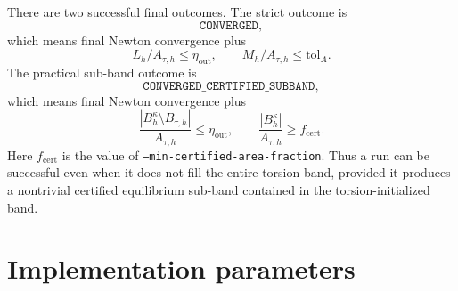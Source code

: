 \documentclass[11pt]{article}
\begin{document}
There are two successful final outcomes.  The strict outcome is
\[
\texttt{CONVERGED},
\]
which means final Newton convergence plus
\[
L_h/A_{\tau,h}\leq\eta_{\mathrm{out}},
\qquad
M_h/A_{\tau,h}\leq \mathrm{tol}_A.
\]
The practical sub-band outcome is
\[
\texttt{CONVERGED\_CERTIFIED\_SUBBAND},
\]
which means final Newton convergence plus
\[
\frac{|B_h^\kappa\setminus B_{\tau,h}|}{A_{\tau,h}}
\leq
\eta_{\mathrm{out}},
\qquad
\frac{|B_h^\kappa|}{A_{\tau,h}}
\geq
f_{\mathrm{cert}}.
\]
Here $f_{\mathrm{cert}}$ is the value of
\texttt{--min-certified-area-fraction}.
Thus a run can be successful even when it does not fill the entire torsion
band, provided it produces a nontrivial certified equilibrium sub-band
contained in the torsion-initialized band.

\section{Implementation parameters}
\end{document}
